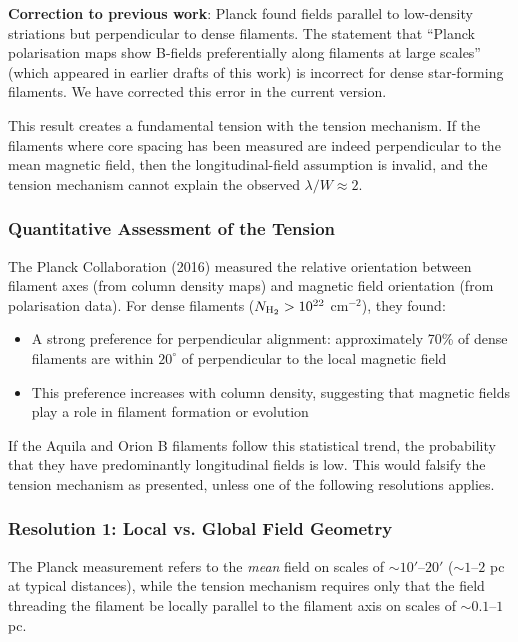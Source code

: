 \documentclass[11pt,a4paper]{article}
\begin{document}
\textbf{Correction to previous work}: Planck found fields parallel to low-density striations but perpendicular to dense filaments. The statement that ``Planck polarisation maps show B-fields preferentially along filaments at large scales'' (which appeared in earlier drafts of this work) is incorrect for dense star-forming filaments. We have corrected this error in the current version.

This result creates a fundamental tension with the tension mechanism. If the filaments where core spacing has been measured are indeed perpendicular to the mean magnetic field, then the longitudinal-field assumption is invalid, and the tension mechanism cannot explain the observed $\lambda/W \approx 2$.

\subsubsection{Quantitative Assessment of the Tension}

The Planck Collaboration (2016) measured the relative orientation between filament axes (from column density maps) and magnetic field orientation (from polarisation data). For dense filaments ($N_{\rm H_2} > 10^{22}$ cm$^{-2}$), they found:
\begin{itemize}
    \item A strong preference for perpendicular alignment: approximately 70\% of dense filaments are within $20^\circ$ of perpendicular to the local magnetic field
    \item This preference increases with column density, suggesting that magnetic fields play a role in filament formation or evolution
\end{itemize}

If the Aquila and Orion B filaments follow this statistical trend, the probability that they have predominantly longitudinal fields is low. This would falsify the tension mechanism as presented, unless one of the following resolutions applies.

\subsubsection{Resolution 1: Local vs. Global Field Geometry}

The Planck measurement refers to the \emph{mean} field on scales of $\sim 10'$--$20'$ ($\sim 1$--$2$ pc at typical distances), while the tension mechanism requires only that the field threading the filament be locally parallel to the filament axis on scales of $\sim 0.1$--$1$ pc.
\end{document}
